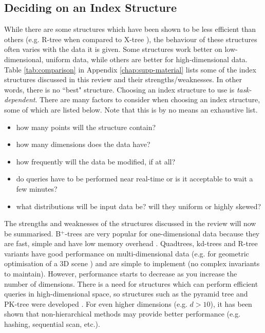 \subsection{Deciding on an Index Structure}
\label{sec:structure-decision}

While there are some structures which have been shown to be less efficient than others (e.g. R-tree when compared to X-tree \cite{x-tree}), the behaviour of these structures often varies with the data it is given. Some structures work better on low-dimensional, uniform data, while others are better for high-dimensional data. Table \ref{tab:comparison} in Appendix \ref{chap:supp-material} lists some of the index structures discussed in this review and their strengths/weaknesses.
In other words, there is no ``best" structure. Choosing an index structure to use is \textit{task-dependent}. There are many factors to consider when choosing an index structure, some of which are listed below. Note that this is by no means an exhaustive list.
\begin{itemize}
	\item how many points will the structure contain?
	\item how many dimensions does the data have?
	\item how frequently will the data be modified, if at all?
	\item do queries have to be performed near real-time or is it acceptable to wait a few minutes?
	\item what distributions will be input data be? will they uniform or highly skewed?
\end{itemize}

The strengths and weaknesses of the structures discussed in the review will now be summarised. B${}^{+}$-trees are very popular for one-dimensional data because they are fast, simple and have low memory overhead \cite{ubiquitous-btree}. Quadtrees, kd-trees and R-tree variants have good performance on multi-dimensional data (e.g. for geometric optimisation of a 3D scene \cite{kd-tree-gpu}) and are simple to implement (no complex invariants to maintain). However, performance starts to decrease as you increase the number of dimensions. There is a need for structures which can perform efficient queries in high-dimensional space, so structures such as the pyramid tree and PK-tree were developed \cite{pk-tree, pyramid-tree}. For even higher dimensions (e.g. $d > 10$), it has been shown that non-hierarchical methods may provide better performance (e.g. hashing, sequential scan, etc.).